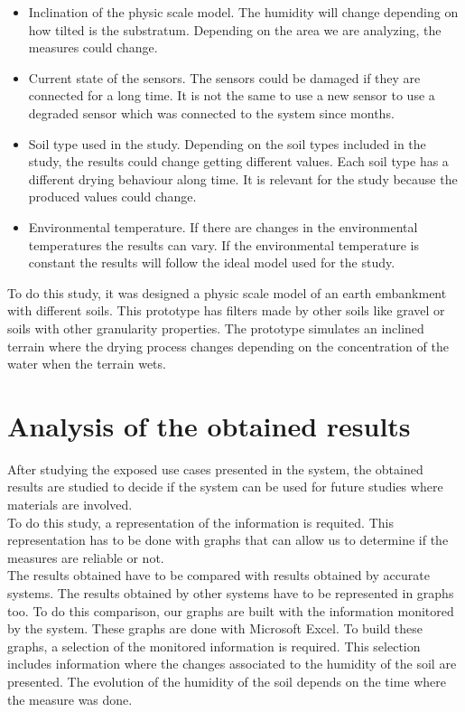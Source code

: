 \begin{itemize}

\item Inclination of the physic scale model. The humidity will change depending on how tilted is the substratum. Depending on the area we are analyzing, the measures could change.

\item Current state of the sensors. The sensors could be damaged if they are connected for a long time. It is not the same to use a new sensor to use a degraded sensor which was connected to the system since months.

\item Soil type used in the study. Depending on the soil types included in the study, the results could change getting different values. Each soil type has a different drying behaviour along time. It is relevant for the study because the produced values could change.

\item Environmental temperature. If there are changes in the environmental temperatures the results can vary. If the environmental temperature is constant the results will follow the ideal model used for the study.

\end{itemize}

To do this study, it was designed a physic scale model of an earth embankment with different soils. This prototype has filters made by other soils like gravel or soils with other granularity properties. The prototype simulates an inclined terrain where the drying process changes depending on the concentration of the water when the terrain wets.

\section{Analysis of the obtained results}

After studying the exposed use cases presented in the system, the obtained results are studied to decide if the system can be used for future studies where materials are involved.\\

To do this study, a representation of the information is requited. This representation has to be done with graphs that can allow us to determine if the measures are reliable or not.\\

The results obtained have to be compared with results obtained by accurate systems. The results obtained by other systems have to be represented in graphs too. To do this comparison, our graphs are built with the information monitored by the system. These graphs are done with Microsoft Excel. To build these graphs, a selection of the monitored information is required. This selection includes information where the changes associated to the humidity of the soil are presented. The evolution of the humidity of the soil depends on the time where the measure was done.\\

